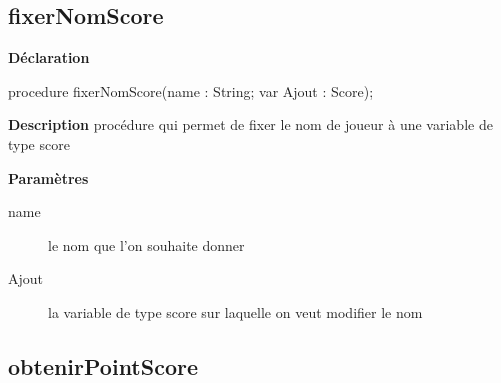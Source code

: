 \documentclass{report}
\newif\ifpdf
\begin{document}
\subsection*{fixerNomScore}
\fi
\label{Types-fixerNomScore}
\begin{list}{}{
\setlength{\itemindent}{0cm}
\setlength{\listparindent}{0cm}
\setlength{\leftmargin}{\evensidemargin}
\addtolength{\leftmargin}{\tmplength}
\settowidth{\labelsep}{X}
\addtolength{\leftmargin}{\labelsep}
\setlength{\labelwidth}{\tmplength}
}
\item[\textbf{Déclaration}\hfill]
\ifpdf
\begin{flushleft}
\fi
\begin{ttfamily}
procedure fixerNomScore(name : String; var Ajout : Score);\end{ttfamily}

\ifpdf
\end{flushleft}
\fi

\par
\item[\textbf{Description}]
procédure qui permet de fixer le nom de joueur à une variable de type score  \par
\item[\textbf{Paramètres}]
\begin{description}
\item[name] le nom que l'on souhaite donner
\item[Ajout] la variable de type score sur laquelle on veut modifier le nom
\end{description}


\end{list}
\ifpdf
\subsection*{\large{\textbf{obtenirPointScore}}\normalsize\hspace{1ex}\hrulefill}
\else
\end{document}
